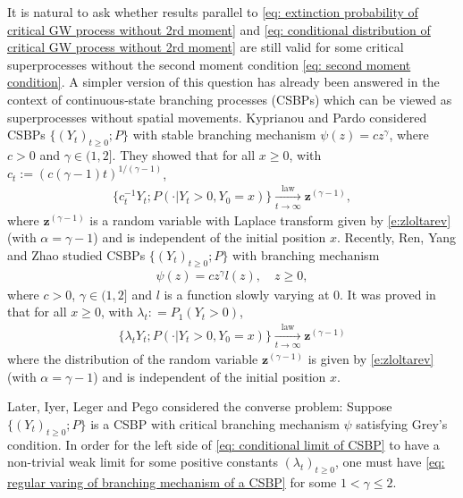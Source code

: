 \documentclass[12pt,a4paper]{amsart}
\theoremstyle{definition}
\numberwithin{equation}{section}
\begin{document}
It is natural to ask whether results parallel to \eqref{eq: extinction probability of critical GW process without 2rd moment} and \eqref{eq: conditional distribution of critical GW process without 2rd moment} are still valid for some critical superprocesses without the second moment condition \eqref{eq: second moment condition}.
A simpler version of this question has already been answered in the context of continuous-state branching processes	(CSBPs) which can be viewed as superprocesses without spatial movements.
Kyprianou and Pardo \cite{Kyprianou2008Continuous} considered CSBPs $\{(Y_t)_{t\geq 0}; P\}$ with stable branching mechanism $\psi(z) =c z^\gamma$, where $c > 0$ and $\gamma \in (1,2]$.
They showed that for all $x\geq 0$, with $c_t := (c(\gamma - 1)t)^{1/(\gamma - 1)}$,
\begin{align} \label{eq: conditional limit of CSBP with stable branching}
	\{c_t^{-1}Y_t; P( \cdot |Y_t > 0,Y_0 = x)\}
	\xrightarrow[t\to \infty]{\operatorname{law}} \mathbf z^{(\gamma - 1)},
\end{align}
where $\mathbf z^{(\gamma - 1)}$ is a random variable with Laplace transform given by \eqref{e:zloltarev} (with $\alpha=\gamma-1$) and 
is independent of the initial position $x$.
Recently, Ren, Yang and Zhao \cite{RenYangZhao2014Conditional} studied CSBPs $\{(Y_t)_{t\ge 0}; P\}$ with branching mechanism
\begin{align}\label{eq: regular varing of branching mechanism of a CSBP}
	\psi(z)
	= c z^\gamma l(z),
	\quad z\geq 0,
\end{align}
where $c > 0$, $\gamma \in (1,2]$ and $l$ is a function slowly varying  at $0$.
It was proved in  \cite{RenYangZhao2014Conditional} that for all $x\geq 0$, with $\lambda_t: = P_1(Y_t > 0)$,
\begin{align}\label{eq: conditional limit of CSBP}
	\{ \lambda_t Y_t ; P(\cdot | Y_t > 0, Y_0 = x)\}
  \xrightarrow[t\to \infty]{\operatorname{law}} \mathbf z^{(\gamma - 1)}
\end{align}
where the distribution of the random variable $\mathbf z^{(\gamma - 1)}$ is given by \eqref{e:zloltarev} (with $\alpha=\gamma-1$) and 
is independent of the initial position $x$.

Later, Iyer, Leger and Pego \cite{IyerLegerPego2015Limit} considered the converse problem:
Suppose  $\{(Y_t)_{t\geq 0}; P\}$ is a CSBP
with critical branching mechanism $\psi$ satisfying Grey's condition.
In order for the left side of \eqref{eq: conditional limit of CSBP} to have a non-trivial weak limit for some positive constants $(\lambda_t)_{t\geq 0}$, one must have \eqref{eq: regular varing of branching mechanism of a CSBP} for some $1< \gamma \leq 2$.
	
\end{document}
